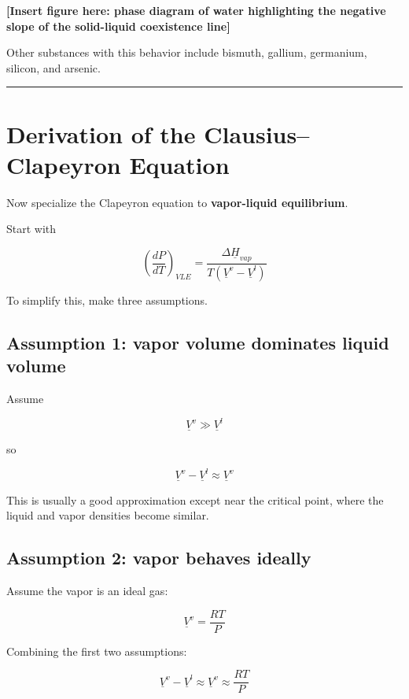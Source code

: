 \documentclass[
  letterpaper,
  DIV=11,
  numbers=noendperiod]{scrartcl}
\begin{document}
\textbf{{[}Insert figure here: phase diagram of water highlighting the
negative slope of the solid-liquid coexistence line{]}}

Other substances with this behavior include bismuth, gallium, germanium,
silicon, and arsenic.

\begin{center}\rule{0.5\linewidth}{0.5pt}\end{center}

\section{Derivation of the Clausius--Clapeyron
Equation}\label{derivation-of-the-clausiusclapeyron-equation}

Now specialize the Clapeyron equation to \textbf{vapor-liquid
equilibrium}.

Start with

\[
\left(\frac{dP}{dT}\right)_{VLE}
=
\frac{\Delta \underline{H}_{vap}}{T(\underline{V}^v-\underline{V}^l)}
\]

To simplify this, make three assumptions.

\subsection{Assumption 1: vapor volume dominates liquid
volume}\label{assumption-1-vapor-volume-dominates-liquid-volume}

Assume

\[
\underline{V}^v \gg \underline{V}^l
\]

so

\[
\underline{V}^v - \underline{V}^l \approx \underline{V}^v
\]

This is usually a good approximation except near the critical point,
where the liquid and vapor densities become similar.

\subsection{Assumption 2: vapor behaves
ideally}\label{assumption-2-vapor-behaves-ideally}

Assume the vapor is an ideal gas:

\[
\underline{V}^v = \frac{RT}{P}
\]

Combining the first two assumptions:

\[
\underline{V}^v - \underline{V}^l \approx \underline{V}^v \approx \frac{RT}{P}
\]
\end{document}
